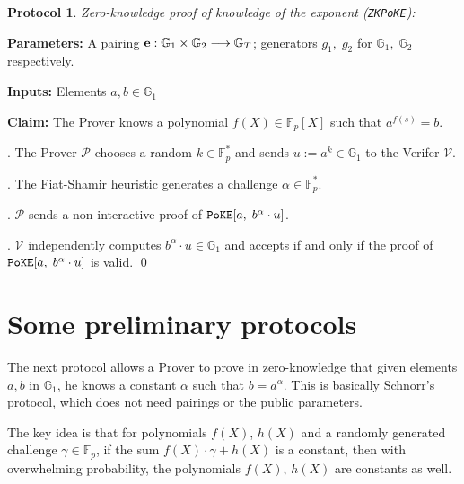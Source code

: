 \documentclass[11pt, lettersize, notitlepage, leqno, footskip=0.6cm]{article}
\newcommand{\bFp}{\mathbb{F}_p}
\newcommand{\bG}{\mathbb{G}}
\newcommand{\lra}{\longrightarrow}
\newcommand{\mc}{\mathcal}
\newcommand{\mb}{\mathbb}
\newcommand{\al}{\alpha}
\newcommand{\mP}{\mc{P}}
\newcommand{\V}{\mc{V}}
\newcommand{\noin}{\noindent}
\newcommand{\op}{overwhelming probability}
\newtheorem{Prot}[Thm]{Protocol}
\numberwithin{equation}{section}
\begin{document}
\begin{mdframed}
\begin{Prot} \normalfont \hypertarget{ZKPoKE}{\textit{Zero-knowledge proof of knowledge of the exponent}} (\verb|ZKPoKE|):\end{Prot} 

\noin \textbf{Parameters:} A pairing ${\bf{e}}:\mb{G}_1\times \mb{G}_2\lra \mb{G}_T$; generators $g_1,\;g_2$ for $\mb{G}_1,\; \mb{G}_2$ respectively.

\noin \textbf{Inputs:} Elements $a, b\in \mb{G}_1$

\noin \textbf{Claim:} The Prover knows a polynomial $f(X)\in \bFp[X]$ such that $a^{f(s)} = b$.\vspace{2mm}

\noin 1. The Prover $\mP$ chooses a random $k\in \bFp^*$ and sends $u:= a^k\in \mb{G}_1$ to the Verifer $\V$. \vspace{1mm}

\noin 2. The Fiat-Shamir heuristic generates a challenge $\al\in \bFp^*$. \vspace{1mm}

\noin 3. $\mP$ sends a non-interactive proof of ${\tt{PoKE}}[a,\; b^{\al}\cdot u]$. \vspace{1mm}

\noin 4. $\V$ independently computes $b^{\al}\cdot u\in\mb{G}_1$ and accepts if and only if the proof of ${\tt{PoKE}}[a,\; b^{\al}\cdot u]$ is valid. \qed \end{mdframed}

\bigskip




\section{\fontsize{11}{11}\selectfont Some preliminary protocols}

The next protocol allows a Prover to prove in zero-knowledge that  given elements $a,b$ in $\bG_1$, he knows a constant $\al$ such that $b = a^{\al} $. This is basically Schnorr's protocol, which does not need pairings or the public parameters.

The key idea is that for polynomials $f(X)$, $h(X)$ and a randomly generated challenge $\gamma\in \bFp$, if the sum $f(X)\cdot \gamma + h(X)$ is a constant, then with \op, the polynomials $f(X)$, $h(X)$ are constants as well.

\bigskip
\end{document}
